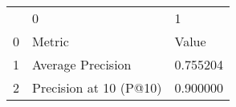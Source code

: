 \begin{tabular}{lll}
 & 0 & 1 \\
0 & Metric & Value \\
1 & Average Precision & 0.755204 \\
2 & Precision at 10 (P@10) & 0.900000 \\
\end{tabular}
